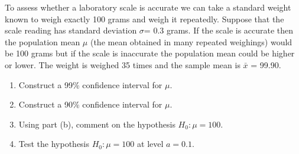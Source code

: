   \item
    To assess whether a laboratory scale is accurate we can take a standard
    weight known to weigh exactly 100 grams and weigh it repeatedly.  Suppose
    that the scale reading has standard deviation
    $\sigma$= 0.3 grams. If the scale is accurate then the population mean
    $\mu$ (the mean obtained in many repeated weighings) would be 100 grams but
    if the scale is inaccurate the population mean could be higher or lower.  
    The weight is weighed 35 times and the sample mean is $\bar{x}$ =
        99.90.
    \begin{enumerate}	 
      \item Construct a 99\% confidence interval for $\mu$.
      \item Construct a 90\% confidence interval for $\mu$.
      \item Using part (b), comment on the hypothesis
        $H_0: \mu=100$.
      \item Test the hypothesis $H_0: \mu=100$ at level $a=0.1$.
    \end{enumerate}  
    
    
